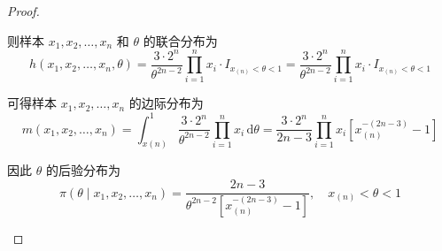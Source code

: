 \documentclass[normal,cn]{elegantnote}
\begin{document}
\begin{enumerate}
\begin{proof}
\begin{enumerate}
                      则样本 $x_{1},x_{2},\ldots,x_{n}$ 和 $\theta$ 的联合分布为
                      \begin{equation*}
                          h\left(x_{1},x_{2},\ldots,x_{n},\theta\right)=\frac{3\cdot 2^{n}}{\theta^{2n-2}}\prod_{i=1}^{n}x_{i}\cdot I_{x_{(n)}<\theta<1}=\frac{3\cdot 2^{n}}{\theta^{2n-2}}\prod_{i=1}^{n}x_{i}\cdot I_{x_{(n)}<\theta<1}
                      \end{equation*}

                      可得样本 $x_{1},x_{2},\ldots,x_{n}$ 的边际分布为
                      \begin{equation*}
                          m\left(x_{1},x_{2},\ldots,x_{n}\right)=\int_{x(n)}^{1}\frac{3\cdot 2^{n}}{\theta^{2n-2}}\prod_{i=1}^{n}x_{i}\,\mathrm{d}\theta=\frac{3\cdot 2^{n}}{2n-3}\prod_{i=1}^{n}x_{i}\left[x_{(n)}^{-(2n-3)}-1\right]
                      \end{equation*}

                      因此 $\theta$ 的后验分布为
                      \begin{equation*}
                          \pi\left(\theta\mid x_{1},x_{2},\ldots,x_{n}\right)=\frac{2n-3}{\theta^{2n-2}\left[x_{(n)}^{-(2n-3)}-1\right]},\quad x_{(n)}<\theta<1
                      \end{equation*}
            \end{enumerate}
        \end{proof}
\end{enumerate}
\end{document}
